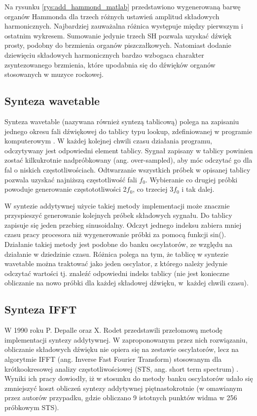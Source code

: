 Na rysunku \ref{rys:add_hammond_matlab} przedstawiono wygenerowaną barwę organów Hammonda dla trzech różnych ustawień amplitud składowych harmonicznych. Najbardziej zauważalna różnica występuje między pierwszym i ostatnim wykresem. 
Sumowanie jedynie trzech SH pozwala uzyskać dźwięk prosty, podobny do brzmienia organów piszczałkowych. Natomiast dodanie dziewięciu składowych harmonicznych bardzo wzbogaca charakter zsyntezowanego brzmienia, które upodabnia się do dźwięków organów stosowanych w muzyce rockowej.

\subsection{Synteza wavetable} \label{add_wavetable}
Synteza wavetable (nazywana również syntezą tablicową) polega na zapisaniu jednego okresu fali dźwiękowej do tablicy typu lookup, zdefiniowanej w programie komputerowym \cite{add_wavetab_synt}. W każdej kolejnej chwili czasu działania programu, odczytywany jest odpowiedni element tablicy. Sygnał zapisany w tablicy powinien zostać kilkukrotnie nadpróbkowany (ang. over-sampled), aby móc odczytać go dla fal o niskich częstotliwościach. 
Odtwarzanie wszystkich próbek w opisanej tablicy pozwala uzyskać najniższą częstotliwość fali $f_0$. Wybieranie co drugiej próbki powoduje generowanie częstototliwości 2$f_0$, co trzeciej 3$f_0$ i tak dalej.

W syntezie addytywnej użycie takiej metody implementacji może znacznie przyspieszyć generowanie kolejnych próbek składowych sygnału. Do tablicy zapisuje się jeden przebieg sinusoidalny. Odczyt jednego indeksu zabiera mniej czasu pracy procesora niż wygenerowanie próbki za pomocą funkcji sin(). Działanie takiej metody jest podobne do banku oscylatorów, ze względu na działanie w dziedzinie czasu. Różnica polega na tym, że tablicę w syntezie wavetable można traktować jako jeden oscylator, z którego należy jedynie odczytać wartości tj. znaleźć odpowiedni indeks tablicy (nie jest konieczne obliczanie na nowo próbki dla każdej składowej dźwięku, w~każdej chwili czasu).

\subsection{Synteza IFFT}
W 1990 roku P. Depalle oraz X. Rodet \cite{add_ifft_orig} przedstawili przełomową metodę implementacji syntezy addytywnej. W zaproponowanym przez nich rozwiązaniu, obliczanie składowych dźwięku nie opiera się na zestawie oscylatorów, lecz na algorytmie IFFT (ang. Inverse Fast Fourier Transform) stosowanym dla krótkookresowej analizy częstotliwościowej (STS, ang. short term spectrum) \cite{add_ifft_method}. Wyniki ich pracy dowiodły, iż w stosunku do metody banku oscylatorów udało się zmniejszyć koszt obliczeń syntezy addytywnej piętnastokrotnie (w omawianym przez autorów przypadku, gdzie obliczano 9 istotnych punktów widma w 256 próbkowym STS).

